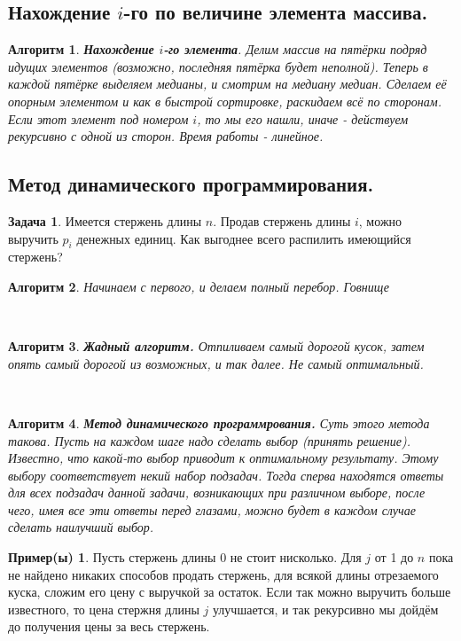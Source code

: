 \documentclass[a4paper]{article}
\theoremstyle{indented}
\newtheorem{alg}{Алгоритм}
\theoremstyle{definition}
\newtheorem{exl}{Пример(ы)}
\newtheorem{prob}{Задача}
\theoremstyle{remark}
\begin{document}
\subsection{Нахождение $i$-го по величине элемента массива.} 

\begin{alg}
    \textbf{Нахождение $i$-го элемента}. Делим массив на пятёрки подряд идущих элементов (возможно, последняя пятёрка будет неполной). Теперь в каждой пятёрке выделяем медианы, и смотрим на медиану медиан. Сделаем её опорным элементом и как в быстрой сортировке, раскидаем всё по сторонам. Если этот элемент под номером $i$, то мы его нашли, иначе - действуем рекурсивно с одной из сторон. Время работы - линейное.
\end{alg}

\subsection{Метод динамического программирования.}

\begin{prob}
    Имеется стержень длины $n$. Продав стержень длины $i$, можно выручить $p_i$ денежных единиц. Как выгоднее всего распилить имеющийся стержень?
\end{prob}

\begin{alg}
    Начинаем с первого, и делаем полный перебор. Говнище
\end{alg} \ 

\begin{alg}
    \textbf{Жадный алгоритм.} Отпиливаем самый дорогой кусок, затем опять самый дорогой из возможных, и так далее. Не самый оптимальный.
\end{alg} \ 

\begin{alg}
    \textbf{Метод динамического программрования.} Суть этого метода такова. Пусть на каждом шаге надо сделать выбор (принять решение). Известно, что какой-то выбор приводит к оптимальному результату. Этому выбору соответствует некий набор подзадач. Тогда сперва находятся ответы для всех подзадач данной задачи, возникающих при различном выборе, после чего, имея все эти ответы перед глазами, можно будет в каждом случае сделать наилучший выбор.
\end{alg}

\begin{exl}
    Пусть стержень длины 0 не стоит нисколько. Для $j$ от 1 до $n$ пока не найдено никаких способов продать стержень, для всякой длины отрезаемого куска, сложим его цену с выручкой за остаток. Если так можно выручить больше известного, то цена стержня длины $j$ улучшается, и так рекурсивно мы дойдём до получения цены за весь стержень. 
\end{exl}
\end{document}

